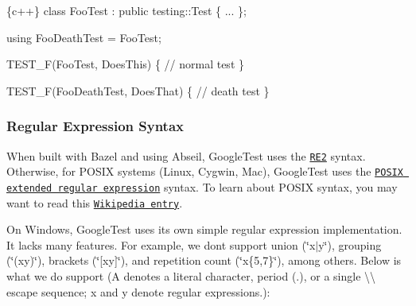 \begin{DoxyCode}
\{c++\}
class FooTest : public testing::Test \{ ... \};

using FooDeathTest = FooTest;

TEST\_F(FooTest, DoesThis) \{
  // normal test
\}

TEST\_F(FooDeathTest, DoesThat) \{
  // death test
\}
\end{DoxyCode}


\subsubsection*{Regular Expression Syntax}

When built with Bazel and using Abseil, Google\+Test uses the \href{https://github.com/google/re2/wiki/Syntax}{\tt R\+E2} syntax. Otherwise, for P\+O\+S\+IX systems (Linux, Cygwin, Mac), Google\+Test uses the \href{https://www.opengroup.org/onlinepubs/009695399/basedefs/xbd_chap09.html#tag_09_04}{\tt P\+O\+S\+IX extended regular expression} syntax. To learn about P\+O\+S\+IX syntax, you may want to read this \href{https://en.wikipedia.org/wiki/Regular_expression#POSIX_extended}{\tt Wikipedia entry}.

On Windows, Google\+Test uses its own simple regular expression implementation. It lacks many features. For example, we don\textquotesingle{}t support union ({\ttfamily \char`\"{}x$\vert$y\char`\"{}}), grouping ({\ttfamily \char`\"{}(xy)\char`\"{}}), brackets ({\ttfamily \char`\"{}\mbox{[}xy\mbox{]}\char`\"{}}), and repetition count ({\ttfamily \char`\"{}x\{5,7\}\char`\"{}}), among others. Below is what we do support ({\ttfamily A} denotes a literal character, period ({\ttfamily .}), or a single {\ttfamily \textbackslash{}\textbackslash{}} escape sequence; {\ttfamily x} and {\ttfamily y} denote regular expressions.)\+:

